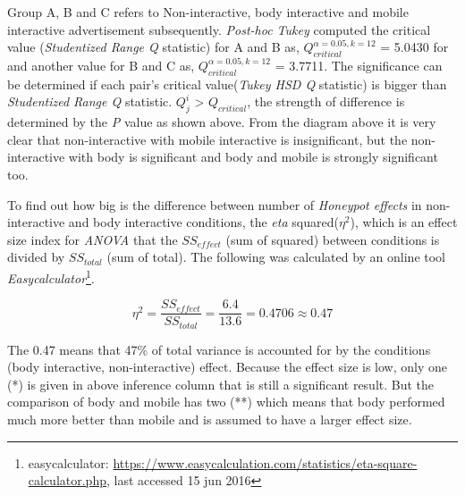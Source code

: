 \begin{table}[H]
\caption{\emph{Post-Hoc Tukey’s HSD} results}
\label{tab:honeypot-non-posthoctukey}
\centering
{}
\end{table}

Group A, B and C refers to Non-interactive, body interactive and mobile interactive advertisement subsequently. \emph{Post-hoc Tukey} computed the critical value (\emph{Studentized Range Q} statistic) for A and B as, ${Q}_{critical}^{\alpha=0.05,k=12}$ = 5.0430 for and another value for B and C as, ${Q}_{critical}^{\alpha=0.05,k=12}$ = 3.7711. The significance can be determined if each pair’s critical value(\emph{Tukey HSD Q} statistic) is bigger than \emph{Studentized Range Q} statistic. ${Q}_{j}^{i }$ > ${Q}_{critical}$, the strength of difference is determined by the \emph{P} value as shown above. From the diagram above it is very clear that non-interactive with mobile interactive is insignificant, but the non-interactive with body is significant and body and mobile is strongly significant too.

To find out how big is the difference between number of \emph{Honeypot effects} in non-interactive and body interactive conditions, the \emph{eta} squared(${\eta}^2$), which is an effect size index for \emph{ANOVA} that the $SS_{effect}$ (sum of squared) between conditions is divided by $SS_{total}$  (sum of total). The following was calculated by an online tool \emph{Easycalculator}\footnote{easycalculator: \url{https://www.easycalculation.com/statistics/eta-square-calculator.php}, last accessed 15 jun 2016}.

\[
{\eta}^2 = \frac{{SS}_{effect}}{{SS}_{total}} = \frac{6.4}{13.6} = 0.4706 \approx 0.47
\]

The 0.47 means that 47\% of total variance is accounted for by the conditions (body interactive, non-interactive) effect. Because the effect size is low, only one (*) is given in above inference column that is still a significant result. But the comparison of body and mobile has two (**) which means that body performed much more better than mobile and is assumed to have a larger effect size.

